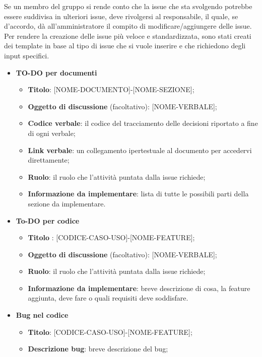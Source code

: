Se un membro del gruppo si rende conto che la issue che sta
svolgendo potrebbe essere suddivisa in ulteriori issue, deve rivolgersi al
responsabile, il quale, se d'accordo, dà all'amministratore
il compito di modificare/aggiungere delle issue. Per rendere la
creazione delle issue più veloce e standardizzata, sono stati creati dei template in base al tipo di
issue che si vuole inserire e che richiedono degli input specifici.
\begin{itemize}
    \item  \textbf{TO-DO per documenti}
          \begin{itemize}
              \item \textbf{Titolo}: [NOME-DOCUMENTO]-[NOME-SEZIONE];
              \item \textbf{Oggetto di discussione} (facoltativo): [NOME-VERBALE];
              \item \textbf{Codice verbale}: il codice del tracciamento delle decisioni riportato a fine di ogni verbale;
              \item \textbf{Link verbale}: un collegamento ipertestuale al documento per accedervi direttamente;
              \item \textbf{Ruolo}: il ruolo che l'attività puntata dalla issue richiede;
              \item \textbf{Informazione da implementare}: lista di tutte le possibili parti della sezione da implementare.
          \end{itemize}
    \item  \textbf{To-DO per codice}
          \begin{itemize}
              \item \textbf{Titolo} : [CODICE-CASO-USO]-[NOME-FEATURE];
              \item \textbf{Oggetto di discussione} (facoltativo): [NOME-VERBALE];
              \item \textbf{Ruolo}: il ruolo che l'attività puntata dalla issue richiede;
              \item \textbf{Informazione da implementare}: breve descrizione di cosa, la feature aggiunta, deve fare o quali requisiti deve soddisfare.
          \end{itemize}
    \item  \textbf{Bug nel codice}
          \begin{itemize}
              \item \textbf{Titolo}: [CODICE-CASO-USO]-[NOME-FEATURE];
              \item \textbf{Descrizione bug}: breve descrizione del bug;

\end{itemize}
\end{itemize}
